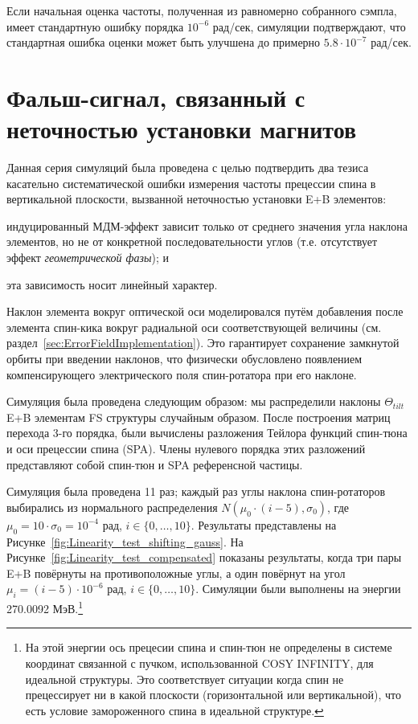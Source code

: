 \documentclass{report}
\newcommand{\vp}[2]{{#1}\cdot 10^{#2}}
\begin{document}
Если начальная оценка частоты, полученная из равномерно собранного
сэмпла, имеет стандартную ошибку порядка $10^{-6}$ рад/сек, симуляции
подтверждают, что стандартная ошибка оценки может быть улучшена до примерно $\vp{5.8}{-7}$ рад/сек.

\section{Фальш-сигнал, связанный с неточностью установки магнитов}\label{sec:FalseSignalSim}
Данная серия симуляций была проведена с целью подтвердить два тезиса
касательно систематической ошибки измерения частоты прецессии спина в
вертикальной плоскости, вызванной неточностью установки E+B элементов:
\begin{inparaenum}[1)]
\item индуцированный МДМ-эффект зависит только от среднего значения
  угла наклона элементов, но не от  конкретной последовательности
  углов (т.е. отсутствует эффект \emph{геометрической фазы}); и
\item эта зависимость носит линейный характер.
\end{inparaenum}

Наклон элемента вокруг оптической оси моделировался путём добавления
после элемента спин-кика вокруг радиальной оси соответствующей
величины (см. раздел~\ref{sec:ErrorFieldImplementation}). Это
гарантирует сохранение замкнутой орбиты при введении наклонов, что
физически обусловлено появлением компенсирующего электрического поля 
спин-ротатора при его наклоне.

Симуляция была проведена следующим образом: мы распределили наклоны
$\Theta_{tilt}$ E+B элементам FS структуры случайным образом. После
построения матриц перехода 3-го порядка, были вычислены разложения
Тейлора функций спин-тюна и оси прецессии спина (SPA). Члены нулевого
порядка этих разложений представляют собой спин-тюн и SPA референсной частицы.

Симуляция была проведена 11 раз; каждый раз углы наклона
спин-ротаторов выбирались из нормального распределения
$N(\mu_0\cdot(i-5), \sigma_0)$, где $\mu_0 = 10\cdot \sigma_0 =
10^{-4}$ рад, $i\in\lbrace0,\dots, 10\rbrace$. Результаты представлены
на Рисунке~\ref{fig:Linearity_test_shifting_gauss}. На
Рисунке~\ref{fig:Linearity_test_compensated} показаны результаты,
когда три пары E+B повёрнуты на противоположные углы, а один повёрнут на угол
$\mu_i = (i-5)\cdot 10^{-6}$ рад,
$i\in\lbrace0,\dots,10\rbrace$. Симуляции были выполнены на энергии
270.0092 МэВ.\footnote{На этой энергии ось прецесии спина и спин-тюн
  не определены в системе координат связанной с пучком, использованной
  COSY INFINITY, для идеальной структуры. Это соответствует ситуации
  когда спин не прецессирует ни в какой плоскости (горизонтальной или
  вертикальной), что есть условие замороженного спина в идеальной структуре.}
\end{document}
